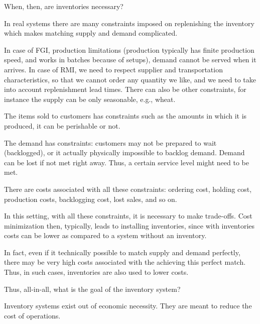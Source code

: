 \begin{question}
When, then, are inventories necessary?
  \begin{solution}
    In real systems there are many constraints imposed on replenishing
    the inventory which makes matching supply and demand
    complicated.

    In case of FGI, production limitations (production typically has
    finite production speed, and works in batches because of setups),
    demand cannot be served when it arrives.  In case of RMI, we need
    to respect supplier and transportation characteristics, so that we
    cannot order any quantity we like, and we need to take into
    account replenishment lead times. There can also be other
    constraints, for instance the supply can be only seasonable, e.g.,
    wheat.

    The items sold to customers has constraints such as the amounts in
    which it is produced, it can be perishable or not.

    The demand has constraints: customers may not be prepared to wait
    (backlogged), or it actually physically impossible to backlog
    demand. Demand can be lost if not met right away. Thus, a certain
    service level might need to be met.

    
    There are costs associated with all these constraints: ordering
    cost, holding cost, production costs, backlogging cost, lost
    sales, and so on.

    In this setting, with all these constraints, it is necessary to
    make trade-offs. Cost minimization then, typically, leads to
    installing inventories, since with inventories costs can be lower
    as compared to a system without an inventory. 


    In fact, even if it technically possible to match supply and
    demand perfectly, there may be very high costs associated with the
    achieving this perfect match. Thus, in such cases, inventories are
    also used  to lower costs.
  \end{solution}
\end{question}


\begin{question}
Thus, all-in-all, what is the goal of the inventory system?
  \begin{solution}
    Inventory systems exist out of economic necessity. They are meant
    to reduce the cost of operations. 
  \end{solution}
\end{question}


